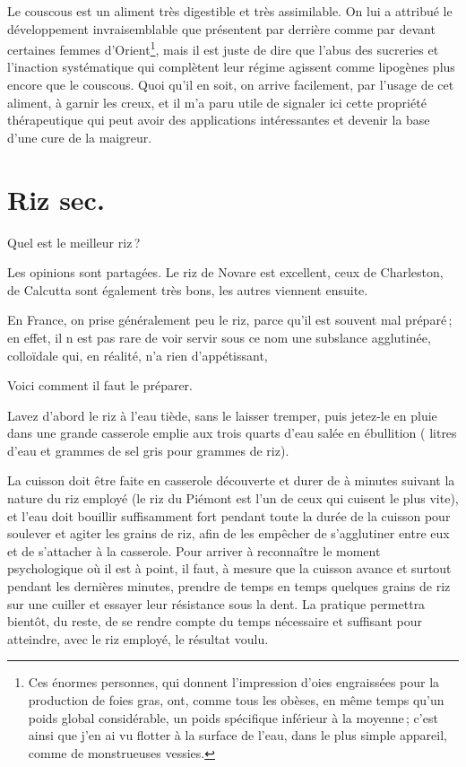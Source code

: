 Le couscous est un aliment très digestible et très assimilable. On lui
a attribué le développement invraisemblable que présentent par derrière comme
par devant certaines femmes d'Orient\footnote{ Ces énormes personnes, qui
donnent l'impression d'oies engraissées pour la production de foies gras, ont,
comme tous les obèses, en même temps qu'un poids global considérable, un poids
spécifique inférieur à la moyenne ; c'est ainsi que j'en ai vu flotter à la
surface de l'eau, dans le plus simple appareil, comme de monstrueuses
vessies.}, mais il est juste de dire que l'abus des sucreries et l'inaction
systématique qui complètent leur régime agissent comme lipogènes plus encore
que le couscous. Quoi qu'il en soit, on arrive facilement, par l'usage de cet
aliment, à garnir les creux, et il m'a paru utile de signaler ici cette
propriété thérapeutique qui peut avoir des applications intéressantes et
devenir la base d'une cure de la maigreur.

\section*{\centering Riz sec.}
{}

Quel est le meilleur riz ?

Les opinions sont partagées. Le riz de Novare est excellent, ceux de
Charleston, de Calcutta sont également très bons, les autres viennent ensuite.

En France, on prise généralement peu le riz, parce qu'il est souvent mal
préparé ; en effet, il n est pas rare de voir servir sous ce nom une subslance
agglutinée, colloïdale qui, en réalité, n'a rien d'appétissant,

\label{pg0707} \hypertarget{p0707}{}
Voici comment il faut le préparer.

Lavez d'abord le riz à l'eau tiède, sans le laisser tremper, puis jetez-le en
pluie dans une grande casserole emplie aux trois quarts d'eau salée en
ébullition ({\mmm} litres d'eau et {\mmm} grammes de sel gris pour
{\mmm} grammes de riz).

La cuisson doit être faite en casserole découverte et durer de {\mmm}
à {\mmm} minutes suivant la nature du riz employé (le riz du Piémont est
l'un de ceux qui cuisent le plus vite), et l'eau doit bouillir suffisamment
fort pendant toute la durée de la cuisson pour soulever et agiter les grains de
riz, afin de les empêcher de s'agglutiner entre eux et de s'attacher à la
casserole. Pour arriver à reconnaître le moment psychologique où il est
à point, il faut, à mesure que la cuisson avance et surtout pendant les
dernières minutes, prendre de temps en temps quelques grains de riz sur une
cuiller et essayer leur résistance sous la dent. La pratique permettra bientôt,
du reste, de se rendre compte du temps nécessaire et suffisant pour atteindre,
avec le riz employé, le résultat voulu.

